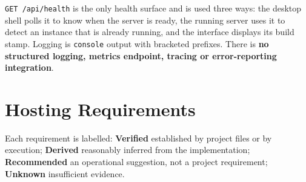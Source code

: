 \documentclass[11pt,a4paper]{report}
\newcommand{\code}[1]{\texttt{\small #1}}
\newcommand{\lblV}{\textcolor{cBack}{\textbf{Verified}}}
\newcommand{\lblD}{\textcolor{cFront}{\textbf{Derived}}}
\newcommand{\lblR}{\textcolor{cInfra}{\textbf{Recommended}}}
\newcommand{\lblU}{\textcolor{cNote}{\textbf{Unknown}}}
\begin{document}
\code{GET /api/health} is the only health surface and is used three ways: the
desktop shell polls it to know when the server is ready, the running server uses
it to detect an instance that is already running, and the interface displays its
build stamp. Logging is \code{console} output with bracketed prefixes. There is
\textbf{no structured logging, metrics endpoint, tracing or error-reporting
integration}.

\chapter{Hosting Requirements}
\label{sec:hosting}

Each requirement is labelled: \lblV{} established by project files or by
execution; \lblD{} reasonably inferred from the implementation; \lblR{} an
operational suggestion, not a project requirement; \lblU{} insufficient evidence.
\end{document}
